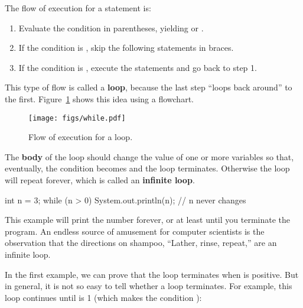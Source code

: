 The flow of execution for a  statement is:

\begin{enumerate}

\item Evaluate the condition in parentheses, yielding  or .

\item If the condition is , skip the following statements in braces.

\item If the condition is , execute the statements and go back to step 1.

\end{enumerate}


This type of flow is called a {\bf loop}, because the last step ``loops back around'' to the first.
Figure~\ref{fig.while} shows this idea using a flowchart.

\begin{figure}[!ht]
\begin{center}
\texttt{[image: figs/while.pdf]}
\caption{Flow of execution for a  loop.}
\label{fig.while}
\end{center}
\end{figure}


The {\bf body} of the loop should change the value of one or more variables so that, eventually, the condition becomes  and the loop terminates.
Otherwise the loop will repeat forever, which is called an {\bf infinite loop}.

\begin{code}
int n = 3;
while (n > 0) {
    System.out.println(n);
    // n never changes
}
\end{code}

This example will print the number  forever, or at least until you terminate the program.
An endless source of amusement for computer scientists is the observation that the directions on shampoo, ``Lather, rinse, repeat,'' are an infinite loop.

In the first example, we can prove that the loop terminates when  is positive.
But in general, it is not so easy to tell whether a loop terminates.
For example, this loop continues until  is 1 (which makes the condition ):

